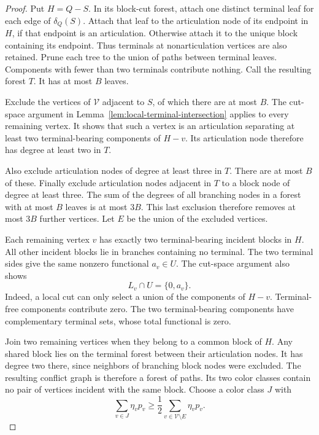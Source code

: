\begin{proof}
Put $H=Q-S$.
In its block-cut forest, attach one distinct terminal leaf for each edge of $\delta_Q(S)$.
Attach that leaf to the articulation node of its endpoint in $H$, if that endpoint is an articulation.
Otherwise attach it to the unique block containing its endpoint.
Thus terminals at nonarticulation vertices are also retained.
Prune each tree to the union of paths between terminal leaves.
Components with fewer than two terminals contribute nothing.
Call the resulting forest $T$.
It has at most $B$ leaves.

Exclude the vertices of $\mathcal V$ adjacent to $S$, of which there are at most $B$.
The cut-space argument in Lemma~\ref{lem:local-terminal-intersection} applies to every remaining vertex.
It shows that such a vertex is an articulation separating at least two terminal-bearing components of $H-v$.
Its articulation node therefore has degree at least two in $T$.

Also exclude articulation nodes of degree at least three in $T$.
There are at most $B$ of these.
Finally exclude articulation nodes adjacent in $T$ to a block node of degree at least three.
The sum of the degrees of all branching nodes in a forest with at most $B$ leaves is at most $3B$.
This last exclusion therefore removes at most $3B$ further vertices.
Let $E$ be the union of the excluded vertices.

Each remaining vertex $v$ has exactly two terminal-bearing incident blocks in $H$.
All other incident blocks lie in branches containing no terminal.
The two terminal sides give the same nonzero functional $a_v\in U$.
The cut-space argument also shows
\begin{equation}\label{eq:block-intersection-line}
 L_v\cap U=\{0,a_v\}.
\end{equation}
Indeed, a local cut can only select a union of the components of $H-v$.
Terminal-free components contribute zero.
The two terminal-bearing components have complementary terminal sets, whose total functional is zero.

Join two remaining vertices when they belong to a common block of $H$.
Any shared block lies on the terminal forest between their articulation nodes.
It has degree two there, since neighbors of branching block nodes were excluded.
The resulting conflict graph is therefore a forest of paths.
Its two color classes contain no pair of vertices incident with the same block.
Choose a color class $J$ with
\[
 \sum_{v\in J}\eta_vp_v
 \ge\frac12\sum_{v\in\mathcal V\setminus E}\eta_vp_v.
\]


\end{proof}
